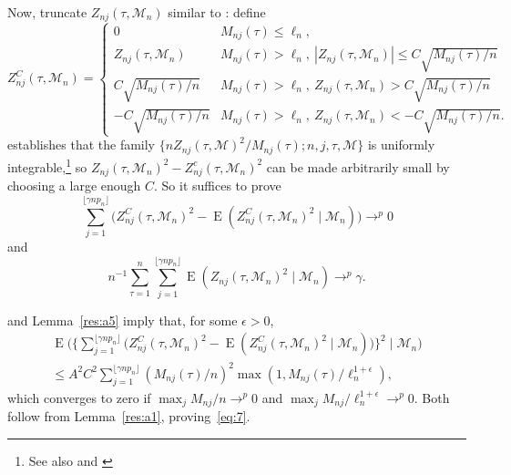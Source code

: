 \documentclass[12pt]{article}
\theoremstyle{definition}
\DeclareMathOperator{\E}{E}
\begin{document}
Now, truncate $Z_{nj}(\tau, \mathcal{M}_n)$ similar to
\citet[Lemma~5]{Jon:97}: define
\begin{equation}\label{eq:3}
  Z^C_{nj}(\tau, \mathcal{M}_n) = 
  \begin{cases}
    0 & M_{nj}(\tau) \leq \ell_n, \\ Z_{nj}(\tau, \mathcal{M}_n) &
    M_{nj}(\tau) > \ell_n ,\ |Z_{nj}(\tau, \mathcal{M}_n)| \leq C
    \sqrt{M_{nj}(\tau)/n} \\ C \sqrt{M_{nj}(\tau)/n} & M_{nj}(\tau) >
    \ell_n ,\ Z_{nj}(\tau, \mathcal{M}_n) >C \sqrt{M_{nj}(\tau)/n} \\
    -C \sqrt{M_{nj}(\tau)/n} & M_{nj}(\tau) > \ell_n,\ Z_{nj}(\tau,
    \mathcal{M}_n) < -C \sqrt{M_{nj}(\tau)/n}.
  \end{cases}
\end{equation}
\citet[Theorem~1.6]{Mcl:75} establishes that the family $\{n
Z_{nj}(\tau, \mathcal{M})^2 / M_{nj}(\tau); n,j,\tau,\mathcal{M}\}$ is
uniformly integrable,\footnote{See also \citet[Lemma 3.2]{Dav:92} and
  \citet[Lemma 5]{Jon:97}} so $Z_{nj}(\tau,\mathcal{M}_n)^2 -
Z^c_{nj}(\tau,\mathcal{M}_n)^2$ can be made arbitrarily small by
choosing a large enough $C$.  So it suffices to prove
\begin{equation}\label{eq:7}
  \sum_{j=1}^{\lfloor \gamma n p_n \rfloor} \big(Z_{nj}^C(\tau,
  \mathcal{M}_n)^2 - \E(Z_{nj}^C(\tau,
  \mathcal{M}_n)^2 \mid \mathcal{M}_n) \big) \to^p 0
\end{equation}
and
\begin{equation}\label{eq:8}
  n^{-1} \sum_{\tau=1}^n \sum_{j=1}^{\lfloor \gamma n p_n \rfloor}
  \E(Z_{nj}(\tau, \mathcal{M}_n)^2 \mid \mathcal{M}_n) \to^p
  \gamma. 
\end{equation}

\citet[Theorem~1.6]{Mcl:75} and Lemma~\ref{res:a5} imply that, for
some $\epsilon > 0$,
\begin{multline}
  \E\Bigg(\Bigg\{\sum_{j=1}^{\lfloor \gamma n p_n \rfloor}
  \big(Z_{nj}^C(\tau, \mathcal{M}_n)^2 - \E(Z_{nj}^C(\tau,
  \mathcal{M}_n)^2 \mid \mathcal{M}_n) \big)\Bigg\}^2 \;\Big|\;
  \mathcal{M}_n \Bigg) \\ \leq A^2 C^2 \sum_{j=1}^{\lfloor \gamma n
    p_n \rfloor} (M_{nj}(\tau)/n)^2 \max(1, M_{nj}(\tau) /
  \ell_n^{1+\epsilon}),
\end{multline}
which converges to zero if $\max_j M_{nj}/n \to^p 0$ and $\max_j
M_{nj}/\ell_n^{1+\epsilon} \to^p 0$.  Both follow from
Lemma~\ref{res:a1}, proving~\eqref{eq:7}.
\end{document}
